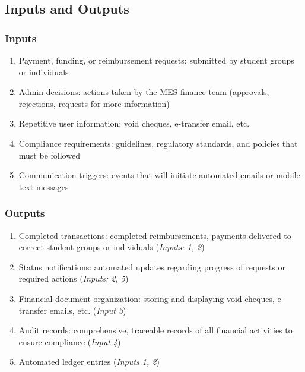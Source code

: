 \documentclass{article}
\begin{document}
\subsection{Inputs and Outputs}


\subsubsection{Inputs}

\begin{enumerate}
    \item Payment, funding, or reimbursement requests: submitted by student groups or individuals
    \item Admin decisions: actions taken by the MES finance team (approvals, rejections, requests for more information)
    \item Repetitive user information: void cheques, e-transfer email, etc.
    \item Compliance requirements: guidelines, regulatory standards, and policies that must be followed
    \item Communication triggers: events that will initiate automated emails or mobile text messages
\end{enumerate}

\subsubsection{Outputs}

\begin{enumerate}
    \item Completed transactions: completed reimbursements, payments delivered to correct student groups or individuals (\emph{Inputs: 1, 2})
    \item Status notifications: automated updates regarding progress of requests or required actions (\emph{Inputs: 2, 5})
    \item Financial document organization: storing and displaying void cheques, e-transfer emails, etc. (\emph{Input 3})
    \item Audit records: comprehensive, traceable records of all financial activities to ensure compliance (\emph{Input 4})
    \item Automated ledger entries (\emph{Inputs 1, 2})
\end{enumerate}
\end{document}

